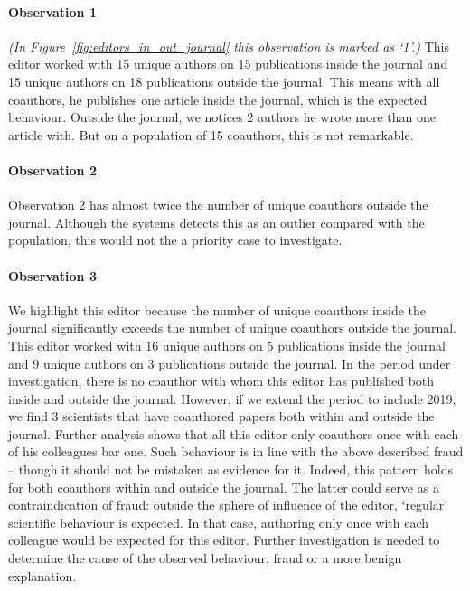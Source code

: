\documentclass{ou-report}
\begin{document}
\paragraph{Observation 1}
\emph{(In Figure~\ref{fig:editors_in_out_journal} this observation is marked as `1'.)}
This editor worked with 15 unique authors on 15 publications inside the journal 
and 15 unique authors on 18 publications outside the journal.
This means with all coauthors, he publishes one article inside the journal,
which is the expected behaviour.
Outside the journal, we notices 2 authors he wrote more than one article with. 
But on a population of 15 coauthors, this is not remarkable.


\paragraph{Observation 2}
Observation 2 has almost twice the number of unique coauthors outside the 
journal. Although the systems detects this as an outlier compared with the 
population, this would not the a priority case to investigate.

\paragraph{Observation 3}
We highlight this editor because the number of unique coauthors 
inside the journal significantly exceeds the number of unique coauthors outside 
the journal. 
This editor worked with 16 unique authors on 5 publications inside the journal 
and 9 unique authors on 3 publications outside the journal. In the period under
investigation, there is no coauthor with whom this editor has published both
inside and outside the journal. However, if we extend  the period to include 2019,
we find 3 scientists that have coauthored papers both within and outside the journal.
Further analysis shows that all this editor only coauthors once with each of his
colleagues bar one. Such behaviour is in line with the above described fraud  -- though
it should not be mistaken as evidence for it. Indeed, this pattern holds for both
coauthors within and outside the journal. The latter could serve as a contraindication
of fraud: outside the sphere of influence of the editor, `regular' scientific behaviour
is expected. In that case, authoring only once with each colleague would be expected for this
editor. Further investigation is needed to determine the cause of the observed behaviour,
fraud or a more benign explanation.
\end{document}
